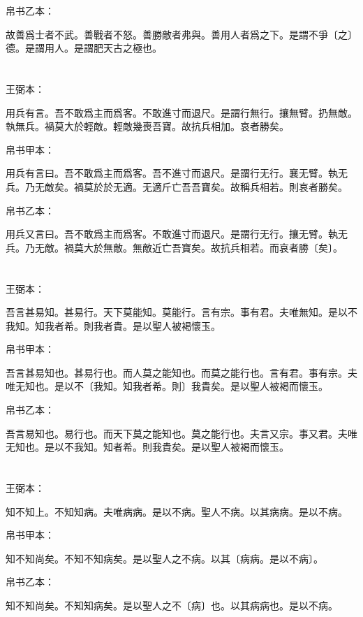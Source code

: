 \documentclass[a5paper]{ctexbook}
\begin{document}
    帛书乙本：

    故善爲士者不武。善戰者不怒。善勝敵者弗與。善用人者爲之下。是謂不爭〔之〕德。是謂用人。是謂肥天古之極也。

    \chapter{}
    王弼本：

    用兵有言。吾不敢爲主而爲客。不敢進寸而退尺。是謂行無行。攘無臂。扔無敵。執無兵。禍莫大於輕敵。輕敵幾喪吾寶。故抗兵相加。哀者勝矣。

    
    帛书甲本：

    用兵有言曰。吾不敢爲主而爲客。吾不進寸而退尺。是謂行无行。襄无臂。執无兵。乃无敵矣。禍莫於於无適。无適斤亡吾吾寶矣。故稱兵相若。則哀者勝矣。

    帛书乙本：

    用兵又言曰。吾不敢爲主而爲客。不敢進寸而退尺。是謂行无行。攘无臂。執无兵。乃无敵。禍莫大於無敵。無敵近亡吾寶矣。故抗兵相若。而哀者勝〔矣〕。

    \chapter{}
    王弼本：

    吾言甚易知。甚易行。天下莫能知。莫能行。言有宗。事有君。夫唯無知。是以不我知。知我者希。則我者貴。是以聖人被褐懷玉。

    
    帛书甲本：

    吾言甚易知也。甚易行也。而人莫之能知也。而莫之能行也。言有君。事有宗。夫唯无知也。是以不〔我知。知我者希。則〕我貴矣。是以聖人被褐而懷玉。

    帛书乙本：

    吾言易知也。易行也。而天下莫之能知也。莫之能行也。夫言又宗。事又君。夫唯无知也。是以不我知。知者希。則我貴矣。是以聖人被褐而懷玉。

    \chapter{}
    王弼本：

    知不知上。不知知病。夫唯病病。是以不病。聖人不病。以其病病。是以不病。

    
    帛书甲本：

    知不知尚矣。不知不知病矣。是以聖人之不病。以其〔病病。是以不病〕。

    帛书乙本：

    知不知尚矣。不知知病矣。是以聖人之不〔病〕也。以其病病也。是以不病。
\end{document}
